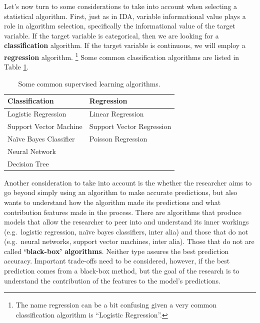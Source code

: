\documentclass[
]{article}
\begin{document}
Let's now turn to some considerations to take into account when selecting a statistical algorithm. First, just as in IDA, variable informational value plays a role in algorithm selection, specifically the informational value of the target variable. If the target variable is categorical, then we are looking for a \textbf{classification} algorithm. If the target variable is continuous, we will employ a \textbf{regression} algorithm. \footnote{The name regression can be a bit confusing given a very common classification algorithm is ``Logistic Regression''.} Some common classification algorithms are listed in Table \ref{tab:pda-algorithms}.

\begin{table}

\caption{\label{tab:pda-algorithms}Some common supervised learning algorithms.}
\centering
\begin{tabular}[t]{ll}
\toprule
Classification & Regression\\
\midrule
Logistic Regression & Linear Regression\\
Support Vector Machine & Support Vector Regression\\
Naïve Bayes Classifier & Poisson Regression\\
Neural Network & \\
Decision Tree & \\
\bottomrule
\end{tabular}
\end{table}

Another consideration to take into account is the whether the researcher aims to go beyond simply using an algorithm to make accurate predictions, but also wants to understand how the algorithm made its predictions and what contribution features made in the process. There are algorithms that produce models that allow the researcher to peer into and understand its inner workings (e.g.~logistic regression, naïve bayes classifiers, inter alia) and those that do not (e.g.~neural networks, support vector machines, inter alia). Those that do not are called \textbf{`black-box' algorithms}. Neither type assures the best prediction accuracy. Important trade-offs need to be considered, however, if the best prediction comes from a black-box method, but the goal of the research is to understand the contribution of the features to the model's predictions.
\end{document}
